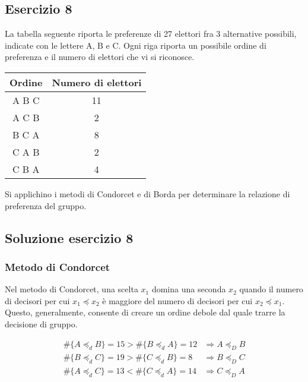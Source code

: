 \documentclass[\main/main.tex]{subfiles}
\begin{document}
\subsection{Esercizio 8}
La tabella seguente riporta le preferenze di 27 elettori fra 3 alternative possibili, indicate con le lettere A, B e C. Ogni riga riporta un possibile ordine di preferenza e il numero di elettori che vi si riconosce.

\begin{table}
  \begin{tabular}{|c|c|}
    \hline
    Ordine & Numero di elettori \\
    \hline
    A B C  & 11                 \\
    \hline
    A C B  & 2                  \\
    \hline
    B C A  & 8                  \\
    \hline
    C A B  & 2                  \\
    \hline
    C B A  & 4                  \\
    \hline
  \end{tabular}
\end{table}

Si applichino i metodi di Condorcet e di Borda per determinare la relazione di preferenza del gruppo.

\subsection{Soluzione esercizio 8}

\subsubsection*{Metodo di Condorcet}
Nel metodo di Condorcet, una scelta $x_1$ domina una seconda $x_2$ quando il numero di decisori per cui $x_1\preceq x_2$ è maggiore del numero di decisori per cui $x_2\preceq x_1$. Questo, generalmente, consente di creare un ordine debole dal quale trarre la decisione di gruppo.

\begin{align*}
  \#\{A \preceq_{d} B\} = 15 > \#\{B \preceq_{d} A\} = 12 & \Rightarrow A \preceq_D B \\
  \#\{B \preceq_{d} C\} = 19 > \#\{C \preceq_{d} B\} = 8  & \Rightarrow B \preceq_D C \\
  \#\{A \preceq_{d} C\} = 13 < \#\{C \preceq_{d} A\} = 14 & \Rightarrow C \preceq_D A
\end{align*}
\end{document}
